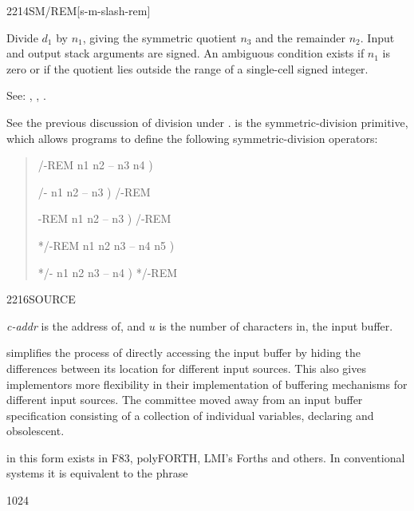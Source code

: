 \begin{newword}{2214}{SM/REM}[s-m-slash-rem]

	Divide $d_1$ by $n_1$, giving the symmetric quotient $n_3$ and
	the remainder $n_2$. Input and output stack arguments are signed.
	An ambiguous condition exists if $n_1$ is zero or if the quotient
	lies outside the range of a single-cell signed integer.

\item[See:]
	,
	,
	.

	\begin{rationale} %
		See the previous discussion of division under .
		 is the symmetric-division primitive, which allows
		programs to define the following symmetric-division operators:

		\begin{quote}\ttfamily
			\word{:} /-REM  n1 n2 -- n3 n4 )
				   
			\word{;}

			\word{:} /-  n1 n2 -- n3 )
				/-REM  
			\word{;}

			\word{:} -REM  n1 n2 -- n3 )
				/-REM 
			\word{;}

			\word{:} */-REM  n1 n2 n3 -- n4 n5 )
				   
			\word{;}

			\word{:} */-  n1 n2 n3 -- n4 )
				*/-REM  
			\word{;}
		\end{quote}
	\end{rationale}
\end{newword}


\begin{newword}{2216}{SOURCE}

	\emph{c-addr} is the address of, and $u$ is the number of
	characters in, the input buffer.

	\begin{rationale} %
		 simplifies the process of directly accessing the
		input buffer by hiding the differences between its location
		for different input sources. This also gives implementors more
		flexibility in their implementation of buffering mechanisms
		for different input sources. The committee moved away from an
		input buffer specification consisting of a collection of
		individual variables, declaring  and 
		obsolescent.

		 in this form exists in F83, polyFORTH, LMI's
		Forths and others. In conventional systems it is equivalent to
		the phrase

		\tab {}  
			   1024
			  
	\end{rationale}
\end{newword}


